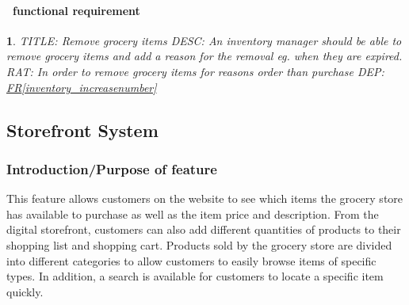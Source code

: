 \documentclass{scrreprt}
\newcounter{funcreq}
\theoremstyle{funreq}
\newtheorem{funreq}{}
\newcommand*{\reqref}[1]{\hyperref[#1]{FR\ref*{#1}}}
\begin{document}
	\paragraph[]{\Subsectionname ~functional requirement }
	\begin{funreq}
		
		\label{inventory_remove}
		TITLE: Remove grocery items
		DESC: An inventory manager should be able to remove grocery items and add a reason for the removal eg. when they are expired.
		RAT: In order to remove grocery items for reasons order than purchase
		DEP: \reqref{inventory_increasenumber}
	\end{funreq}




	
	








	\subsection{Storefront System}
\subsubsection{Introduction/Purpose of feature}
This feature allows customers on the website to see which items the grocery store has available to purchase as well as the item price and description.  From the digital storefront, customers can also add different quantities of products to their shopping list and shopping cart.  Products sold by the grocery store are divided into different categories to allow customers to easily browse items of specific types.  In addition, a search is available for customers to locate a specific item quickly.
\end{document}
